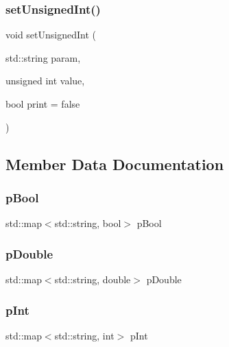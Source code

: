 \subsubsection{\texorpdfstring{set\+Unsigned\+Int()}{setUnsignedInt()}}
{\footnotesize\ttfamily void set\+Unsigned\+Int (\begin{DoxyParamCaption}\item[{std\+::string}]{param,  }\item[{unsigned int}]{value,  }\item[{bool}]{print = {\ttfamily false} }\end{DoxyParamCaption})}



\subsection{Member Data Documentation}
\mbox{\label{classparameters_class_abb7d3139bc101537c7f85fedfe94da2f}} 
\subsubsection{\texorpdfstring{p\+Bool}{pBool}}
{\footnotesize\ttfamily std\+::map$<$std\+::string, bool$>$ p\+Bool\hspace{0.3cm}{\ttfamily [private]}}

\mbox{\label{classparameters_class_a1e0e610c04bda534bcd48bb81ad75ffc}} 
\subsubsection{\texorpdfstring{p\+Double}{pDouble}}
{\footnotesize\ttfamily std\+::map$<$std\+::string, double$>$ p\+Double\hspace{0.3cm}{\ttfamily [private]}}

\mbox{\label{classparameters_class_ac8ac4bc08d6cb6aed011bb1d0fc1203f}} 
\subsubsection{\texorpdfstring{p\+Int}{pInt}}
{\footnotesize\ttfamily std\+::map$<$std\+::string, int$>$ p\+Int\hspace{0.3cm}{\ttfamily [private]}}


